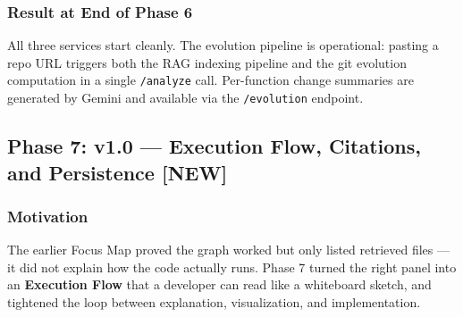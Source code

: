 \documentclass[a4paper,11pt]{article}
\begin{document}
\subsubsection{Result at End of Phase 6}
All three services start cleanly. The evolution pipeline is operational: pasting a repo URL triggers both the RAG indexing pipeline and the git evolution computation in a single \texttt{/analyze} call. Per-function change summaries are generated by Gemini and available via the \texttt{/evolution} endpoint.

\subsection{Phase 7: v1.0 --- Execution Flow, Citations, and Persistence \textbf{[NEW]}}

\subsubsection{Motivation}
The earlier Focus Map proved the graph worked but only listed retrieved files --- it did not explain how the code actually runs. Phase 7 turned the right panel into an \textbf{Execution Flow} that a developer can read like a whiteboard sketch, and tightened the loop between explanation, visualization, and implementation.
\end{document}
